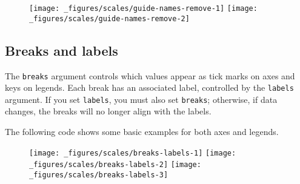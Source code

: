 \begin{figure}[H]
  \texttt{[image: \_figures/scales/guide-names-remove-1]}%
  \texttt{[image: \_figures/scales/guide-names-remove-2]}
\end{figure}

\subsection{Breaks and labels}

The \texttt{breaks} argument controls which values appear as tick marks
on axes and keys on legends. Each break has an associated label,
controlled by the \texttt{labels} argument. If you set \texttt{labels},
you must also set \texttt{breaks}; otherwise, if data changes, the
breaks will no longer align with the labels. 
  

The following code shows some basic examples for both axes and legends.

\begin{Shaded}
\begin{Highlighting}[]
\StringTok{ }\NormalTok{(} \NormalTok{(}\NormalTok{, }\NormalTok{, }\NormalTok{) *}\StringTok{ }\NormalTok{, } \NormalTok{)}
\StringTok{ }\StringTok{ }
\StringTok{  }\NormalTok{() +}\StringTok{ }
\StringTok{  }\NormalTok{(} \NormalTok{, } \NormalTok{)}
\StringTok{ }\NormalTok{(} \NormalTok{(}\NormalTok{, }\NormalTok{))}
\StringTok{ }\NormalTok{(} \NormalTok{(}\NormalTok{, }\NormalTok{), } \NormalTok{(}\NormalTok{, }\NormalTok{))}
\end{Highlighting}
\end{Shaded}

\begin{figure}[H]
  \texttt{[image: \_figures/scales/breaks-labels-1]}%
  \texttt{[image: \_figures/scales/breaks-labels-2]}%
  \texttt{[image: \_figures/scales/breaks-labels-3]}
\end{figure}

